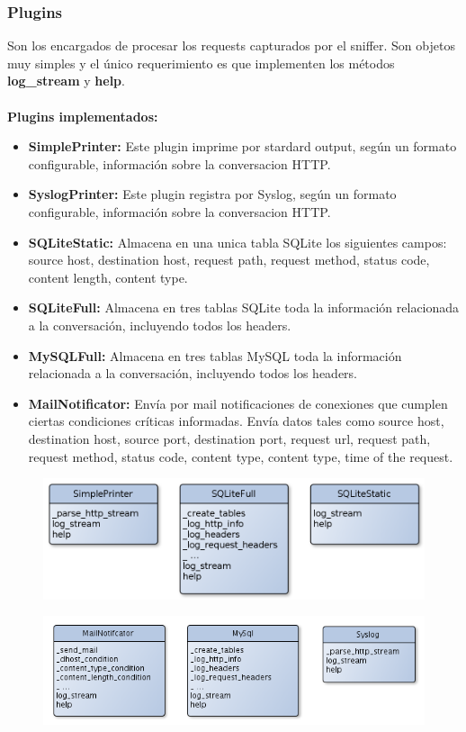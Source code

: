 \subsubsection{Plugins}

Son los encargados de procesar los requests capturados por el sniffer. Son objetos muy simples y el único requerimiento es que implementen los métodos \textbf{log\_stream} y \textbf{help}. 
\\\\
\textbf{Plugins implementados:}
\begin{itemize}
	\item \textbf{SimplePrinter:} Este plugin imprime por stardard output, según un formato configurable, información sobre la conversacion HTTP.
	\item \textbf{SyslogPrinter: } Este plugin registra por Syslog, según un formato configurable, información sobre la conversacion HTTP.
	\item \textbf{SQLiteStatic:} Almacena en una unica tabla SQLite los siguientes campos: source host, destination host, request path, request method, status code, content length, content type.
	\item \textbf{SQLiteFull: } Almacena en tres tablas SQLite toda la información relacionada a la conversación, incluyendo todos los headers.
	\item \textbf{MySQLFull: } Almacena en tres tablas MySQL toda la información relacionada a la conversación, incluyendo todos los headers.
	\item \textbf{MailNotificator: } Envía por mail notificaciones de conexiones que cumplen ciertas condiciones críticas informadas. Envía datos tales como source host, destination host, source port, destination port, request url, request path, request method, status code, content type, content type, time of the request.
\end{itemize}

\begin{figure}[hbtp]
    \centering
	\includegraphics[scale=0.40]{img/Plugins1.png} 
\end{figure}

\begin{figure}[hbtp]
    \centering
	\includegraphics[width=\textwidth]{img/Plugins2.png} 
\end{figure}
